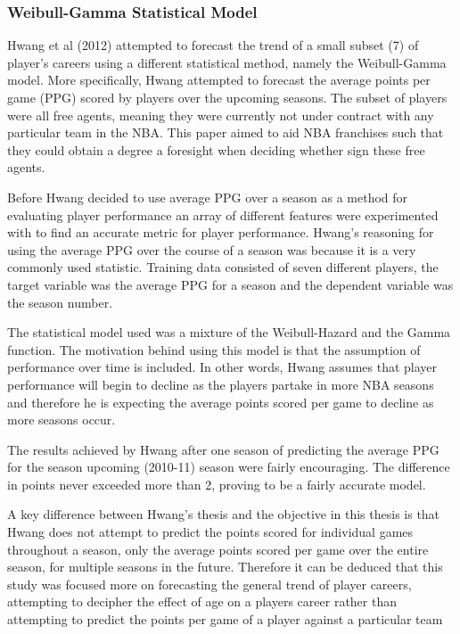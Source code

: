 \documentclass[a4paper,11pt,twoside]{article}
\begin{document}

\subsubsection{Weibull-Gamma Statistical Model}

Hwang et al (2012) attempted to forecast the trend of a small subset (7) of player's careers using a different statistical method, namely the Weibull-Gamma model. More specifically, Hwang attempted to forecast the average points per game (PPG) scored by players over the upcoming seasons. The subset of players were all free agents, meaning they were currently not under contract with any particular team in the NBA. This paper aimed to aid NBA franchises such that they could obtain a degree a foresight when deciding whether sign these free agents.


Before Hwang decided to use average PPG over a season as a method for evaluating player performance an array of different features were experimented with to find an accurate metric for player performance. Hwang's reasoning for using the average PPG over the course of a season was because it is a very commonly used statistic. Training data consisted of seven different players, the target variable was the average PPG for a season and the dependent variable was the season number. 

The statistical model used was a mixture of the Weibull-Hazard and the Gamma function. The motivation behind using this model is that the assumption of performance over time is included. In other words, Hwang assumes that player performance will begin to decline as the players partake in more NBA seasons and therefore he is expecting the average points scored per game to decline as more seasons occur.

The results achieved by Hwang after one season of predicting the average PPG for the season upcoming (2010-11) season were fairly encouraging. The difference in points never exceeded more than 2, proving to be a fairly accurate model.

A key difference between Hwang's thesis and the objective in this thesis is that Hwang does not attempt to predict the points scored for individual games throughout a season, only the average points scored per game over the entire season, for multiple seasons in the future. Therefore it can be deduced that this study was focused more on forecasting the general trend of player careers, attempting to decipher the effect of age on a players career rather than attempting to predict the points per game of a player against a particular team
\end{document}
